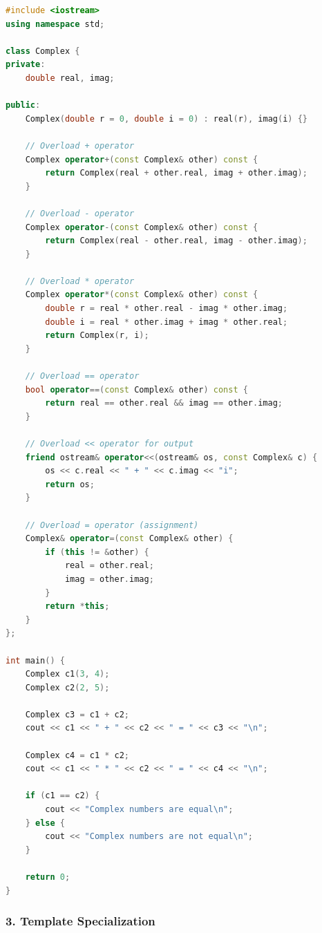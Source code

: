 \begin{lstlisting}[language={C++}]
#include <iostream>
using namespace std;

class Complex {
private:
    double real, imag;
    
public:
    Complex(double r = 0, double i = 0) : real(r), imag(i) {}
    
    // Overload + operator
    Complex operator+(const Complex& other) const {
        return Complex(real + other.real, imag + other.imag);
    }
    
    // Overload - operator
    Complex operator-(const Complex& other) const {
        return Complex(real - other.real, imag - other.imag);
    }
    
    // Overload * operator
    Complex operator*(const Complex& other) const {
        double r = real * other.real - imag * other.imag;
        double i = real * other.imag + imag * other.real;
        return Complex(r, i);
    }
    
    // Overload == operator
    bool operator==(const Complex& other) const {
        return real == other.real && imag == other.imag;
    }
    
    // Overload << operator for output
    friend ostream& operator<<(ostream& os, const Complex& c) {
        os << c.real << " + " << c.imag << "i";
        return os;
    }
    
    // Overload = operator (assignment)
    Complex& operator=(const Complex& other) {
        if (this != &other) {
            real = other.real;
            imag = other.imag;
        }
        return *this;
    }
};

int main() {
    Complex c1(3, 4);
    Complex c2(2, 5);
    
    Complex c3 = c1 + c2;
    cout << c1 << " + " << c2 << " = " << c3 << "\n";
    
    Complex c4 = c1 * c2;
    cout << c1 << " * " << c2 << " = " << c4 << "\n";
    
    if (c1 == c2) {
        cout << "Complex numbers are equal\n";
    } else {
        cout << "Complex numbers are not equal\n";
    }
    
    return 0;
}
\end{lstlisting}

\hypertarget{template-specialization}{%
\subsubsection{3. Template
Specialization}\label{template-specialization}}

